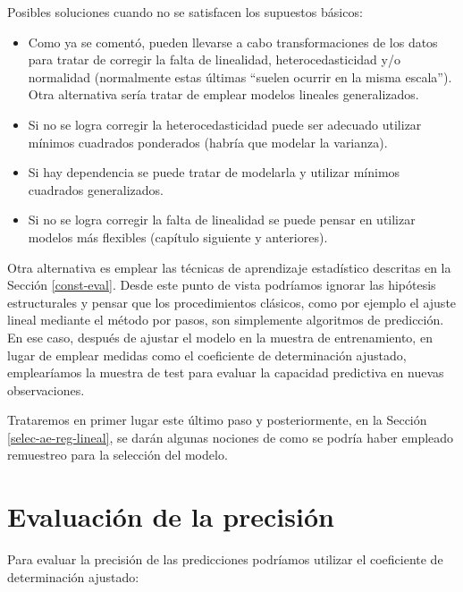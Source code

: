 \documentclass[
]{book}
\newenvironment{Shaded}{\begin{snugshade}}{\end{snugshade}}
\newcommand{\FunctionTok}[1]{\textcolor[rgb]{0.00,0.00,0.00}{#1}}
\newcommand{\NormalTok}[1]{#1}
\newcommand{\SpecialCharTok}[1]{\textcolor[rgb]{0.00,0.00,0.00}{#1}}
\theoremstyle{break}
\theoremstyle{nonumberplain}
\begin{document}
Posibles soluciones cuando no se satisfacen los supuestos básicos:

\begin{itemize}
\item
  Como ya se comentó, pueden llevarse a cabo transformaciones de los datos para tratar de
  corregir la falta de linealidad, heterocedasticidad y/o normalidad
  (normalmente estas últimas ``suelen ocurrir en la misma escala'').
  Otra alternativa sería tratar de emplear modelos lineales generalizados.
\item
  Si no se logra corregir la heterocedasticidad puede ser adecuado
  utilizar mínimos cuadrados ponderados (habría que modelar la varianza).
\item
  Si hay dependencia se puede tratar de modelarla y utilizar mínimos
  cuadrados generalizados.
\item
  Si no se logra corregir la falta de linealidad se puede pensar en
  utilizar modelos más flexibles (capítulo siguiente y anteriores).
\end{itemize}

Otra alternativa es emplear las técnicas de aprendizaje estadístico descritas en la Sección \ref{const-eval}.
Desde este punto de vista podríamos ignorar las hipótesis estructurales y pensar que los procedimientos clásicos, como por ejemplo el ajuste lineal mediante el método por pasos, son simplemente algoritmos de predicción.
En ese caso, después de ajustar el modelo en la muestra de entrenamiento, en lugar de emplear medidas como el coeficiente de determinación ajustado, emplearíamos la muestra de test para evaluar la capacidad predictiva en nuevas observaciones.

Trataremos en primer lugar este último paso y posteriormente, en la Sección \ref{selec-ae-reg-lineal}, se darán algunas nociones de como se podría haber empleado remuestreo para la selección del modelo.

\hypertarget{eval-reg-lineal}{%
\section{Evaluación de la precisión}\label{eval-reg-lineal}}

Para evaluar la precisión de las predicciones podríamos utilizar el coeficiente de determinación ajustado:

\begin{Shaded}
\end{Shaded}
\end{document}
